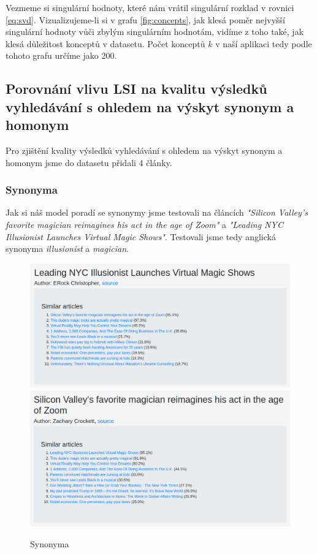 \documentclass[11pt]{scrartcl} %
\begin{document}
Vezmeme si singulární hodnoty, které nám vrátil singulární rozklad v rovnici \ref{eq:svd}. Vizualizujeme-li si v grafu \ref{fig:concepts}, jak klesá poměr nejvyšší singulární hodnoty vůči zbylým singulárním hodnotám, vidíme z toho také, jak klesá důležitost konceptů v datasetu. Počet konceptů $k$ v naší aplikaci tedy podle tohoto grafu určíme jako 200.

\subsection{Porovnání vlivu LSI na kvalitu výsledků vyhledávání s ohledem na výskyt synonym a homonym}

Pro zjištění kvality výsledků vyhledávání s ohledem na výskyt synonym a homonym jsme do datasetu přidali 4 články.

\subsubsection{Synonyma}

Jak si náš model poradí se synonymy jsme testovali na článcích \emph{"Silicon Valley’s favorite magician reimagines his act in the age of Zoom"} a \emph{"Leading NYC Illusionist Launches Virtual Magic Shows"}. Testovali jsme tedy anglická synonyma \emph{illusionist} a \emph{magician}.

\begin{figure}[h] %
	\centering
	\includegraphics[width=0.8\columnwidth]{images/synonyms_0.png}
	\includegraphics[width=0.8\columnwidth]{images/synonyms_1.png}
	\caption{Synonyma}
	\label{fig:synonyms}
\end{figure}
\end{document}
